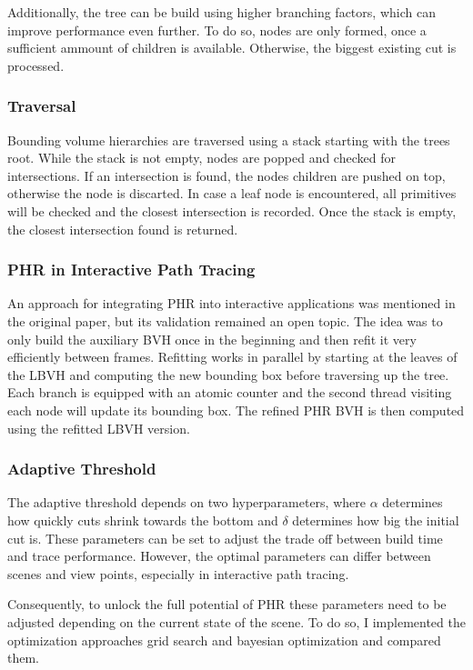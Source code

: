 Additionally, the tree can be build using higher branching factors, which can improve performance even further. To do so, nodes are only formed, once a sufficient ammount of children is available. Otherwise, the biggest existing cut is processed. 

\subsubsection{Traversal}
Bounding volume hierarchies are traversed using a stack starting with the trees root. While the stack is not empty, nodes are popped and checked for intersections. If an intersection is found, the nodes children are pushed on top, otherwise the node is discarted. In case a leaf node is encountered, all primitives will be checked and the closest intersection is recorded. Once the stack is empty, the closest intersection found is returned. 

\subsubsection{PHR in Interactive Path Tracing}
An approach for integrating PHR into interactive applications was mentioned in the original paper\cite{hendrich_parallel_2017}, but its validation remained an open topic. The idea was to only build the auxiliary BVH once in the beginning and then refit it very efficiently between frames. Refitting works in parallel by starting at the leaves of the LBVH and computing the new bounding box before traversing up the tree. Each branch is equipped with an atomic counter and the second thread visiting each node will update its bounding box. The refined PHR BVH is then computed using the refitted LBVH version. 

\subsubsection{Adaptive Threshold}
The adaptive threshold depends on two hyperparameters, where $\alpha$ determines how quickly cuts shrink towards the bottom and $\delta$ determines how big the initial cut is. These parameters can be set to adjust the trade off between build time and trace performance. However, the optimal parameters can differ between scenes and view points, especially in interactive path tracing. %

Consequently, to unlock the full potential of PHR these parameters need to be adjusted depending on the current state of the scene. To do so, I implemented the optimization approaches grid search and bayesian optimization and compared them.

